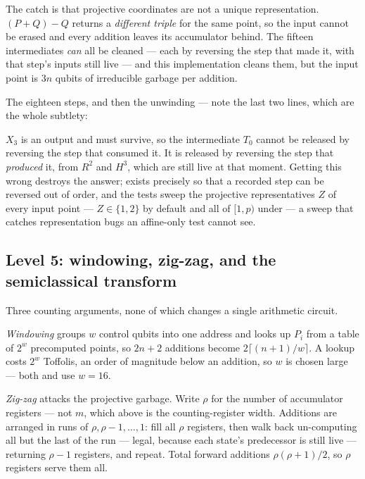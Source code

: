 The catch is that projective coordinates are not a unique representation. $(P+Q)-Q$ returns a
\emph{different triple} for the same point, so the input cannot be erased and every addition leaves
its accumulator behind. The fifteen intermediates \emph{can} all be cleaned --- each by reversing
the step that made it, with that step's inputs still live --- and this implementation cleans them,
but the input point is $3n$ qubits of irreducible garbage per addition.

The eighteen steps, and then the unwinding --- note the last two lines, which are the whole
subtlety:


\begin{warnbox}[title={The order of unwinding is not simply ``backwards''}]
$X_3$ is an output and must survive, so the intermediate $T_0$ cannot be released by reversing the
step that consumed it. It is released by reversing the step that \emph{produced} it, from $R^2$ and
$H^3$, which are still live at that moment. Getting this wrong destroys the answer;
 exists precisely so that a recorded step can be reversed out of order, and the
tests sweep the projective representatives $Z$ of every input point --- $Z\in\{1,2\}$ by default
and all of $[1,p)$ under  --- a sweep that catches representation bugs an
affine-only test cannot see.
\end{warnbox}

\subsection{Level 5: windowing, zig-zag, and the semiclassical transform}\label{ec:sec:window}

Three counting arguments, none of which changes a single arithmetic circuit.

\emph{Windowing} \cite{ec:gidney-ekera} groups $w$ control qubits into one address and looks up
$P_i$ from a table of $2^w$ precomputed points, so $2n+2$ additions become $2\lceil (n{+}1)/w\rceil$.
A lookup costs $2^w$ Toffolis, an order of magnitude below an addition, so $w$ is chosen large ---
both \cite{ec:schrott26} and \cite{ec:babbush26} use $w=16$.

\emph{Zig-zag} \cite{ec:grassl16} attacks the projective garbage. Write $\rho$ for the number of
accumulator registers --- not $m$, which above is the counting-register width. Additions are
arranged in runs of $\rho, \rho-1, \dots, 1$: fill all $\rho$ registers, then walk back
un-computing all but the last of the run --- legal, because each state's predecessor is still live
--- returning $\rho-1$ registers, and repeat. Total forward additions $\rho(\rho+1)/2$, so $\rho$
registers serve them all.

